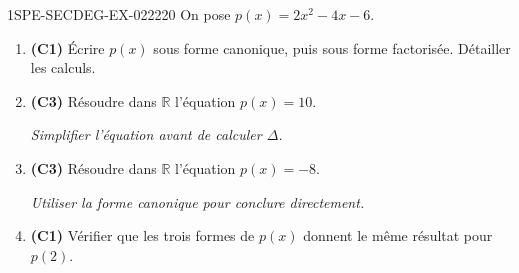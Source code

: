 \begin{exercice}{1SPE-SECDEG-EX-022}{2}{20}
On pose $p(x) = 2x^2 - 4x - 6$.

\begin{enumerate}
  \item \textbf{(C1)} Écrire $p(x)$ sous forme canonique, puis sous forme factorisée. Détailler les calculs.
  \item \textbf{(C3)} Résoudre dans $\mathbb{R}$ l'équation $p(x) = 10$.

  \textit{Simplifier l'équation avant de calculer $\Delta$.}

  \item \textbf{(C3)} Résoudre dans $\mathbb{R}$ l'équation $p(x) = -8$.

  \textit{Utiliser la forme canonique pour conclure directement.}

  \item \textbf{(C1)} Vérifier que les trois formes de $p(x)$ donnent le même résultat pour $p(2)$.
\end{enumerate}
\end{exercice}
